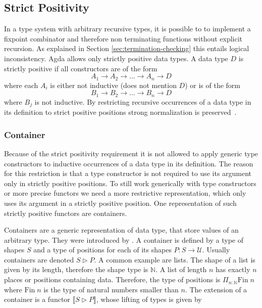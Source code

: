 \subsection{Strict Positivity}

In a type system with arbitrary recursive types, it is possible to to implement a
fixpoint combinator and therefore non terminating functions without explicit
recursion.
As explained in Section \ref{sec:termination-checking} this entails logical
inconsistency.
Agda allows only strictly positive data types.
A data type $D$ is strictly positive if all constructors are of the form
$$
  A_1 \rightarrow A_2 \rightarrow \dots \rightarrow A_n \rightarrow D
$$
where each $A_i$ is either not inductive (does not mention $D$) or is of the form
$$
B_1 \rightarrow B_2 \rightarrow \dots \rightarrow B_n \rightarrow D
$$
where $B_j$ is not inductive.
By restricting recursive occurrences of a data type in its definition to strict
positive positions strong normalization is
preserved~\cite{Wadler1991RecursiveTF}.


\subsubsection{Container}
\label{container}

Because of the strict positivity requirement it is not allowed to apply generic
type constructors to inductive occurrences of a data type in its definition.
The reason for this restriction is that a type constructor is not required to
use its argument only in strictly positive positions.
To still work generically with type constructors or more precise functors we
need a more restrictive representation, which only uses its argument in a
strictly positive position.
One representation of such strictly positive functors are containers.

Containers are a generic representation of data type, that store values of an
arbitrary type.
They were introduced by \textcite{DBLP:conf/fossacs/AbbottAG03}.
A container is defined by a type of shapes $S$ and a type of positions for each
of its shapes $P : S \rightarrow \mathcal{U}$.
Usually containers are denoted $S \rhd P$.
A common example are lists.
The shape of a list is given by its length, therefore the shape type is
$\mathbb{N}$.
A list of length $n$ has exactly $n$ places or positions containing data.
Therefore, the type of positions is $\Pi_{n : \mathbb{N}}\mathrm{Fin}\;n$ where
$\mathrm{Fin}\;n$ is the type of natural numbers smaller than $n$.
The extension of a container is a functor $\lBrack S \rhd P \rBrack $,
whose lifting of types is given by

